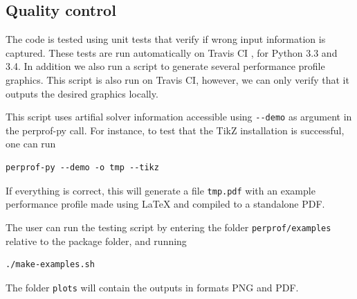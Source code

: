 \subsection*{Quality control}

    The code is tested using unit tests that verify if wrong input information
    is captured. These tests are run automatically on Travis CI
    \cite{url:travis}, for Python 3.3 and 3.4.
    In addition we also run a script to generate several performance profile
    graphics. This script is also run on Travis CI, however, we can only verify
    that it outputs the desired graphics locally.

    This script uses artifial solver information accessible using \verb+--demo+
    as argument in the perprof-py call.
    For instance, to test that the TikZ installation is successful, one can run
\begin{verbatim}
perprof-py --demo -o tmp --tikz
\end{verbatim}
    If everything is correct, this will generate a file \verb+tmp.pdf+ with an
    example performance profile made using LaTeX and compiled to a standalone
    PDF.

    The user can run the testing script
    by entering the folder
    \verb+perprof/examples+ relative to the package folder, and running
\begin{verbatim}
./make-examples.sh
\end{verbatim}
    The folder \verb+plots+ will contain the outputs in formats PNG and PDF.
